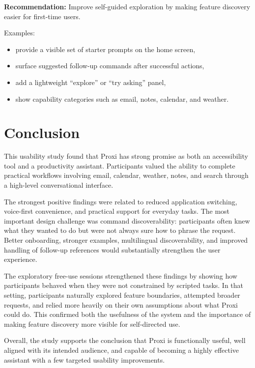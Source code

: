 \documentclass[12pt, titlepage]{article}
\begin{document}
\textbf{Recommendation:} Improve self-guided exploration by making
feature discovery easier for first-time users.

Examples:
\begin{itemize}
    \item provide a visible set of starter prompts on the home screen,
    \item surface suggested follow-up commands after successful actions,
    \item add a lightweight ``explore'' or ``try asking'' panel,
    \item show capability categories such as email, notes, calendar,
    and weather.
\end{itemize}

\section{Conclusion}

This usability study found that Proxi has strong promise as both an
accessibility tool and a productivity assistant. Participants valued the
ability to complete practical workflows involving email, calendar,
weather, notes, and search through a high-level conversational
interface.

The strongest positive findings were related to reduced application
switching, voice-first convenience, and practical support for everyday
tasks. The most important design challenge was command discoverability:
participants often knew what they wanted to do but were not always sure
how to phrase the request. Better onboarding, stronger examples,
multilingual discoverability, and improved handling of follow-up
references would substantially strengthen the user experience.

The exploratory free-use sessions strengthened these findings by showing
how participants behaved when they were not constrained by scripted
tasks. In that setting, participants naturally explored feature
boundaries, attempted broader requests, and relied more heavily on
their own assumptions about what Proxi could do. This confirmed both
the usefulness of the system and the importance of making feature
discovery more visible for self-directed use.

Overall, the study supports the conclusion that Proxi is functionally
useful, well aligned with its intended audience, and capable of becoming
a highly effective assistant with a few targeted usability improvements.

\appendix
\end{document}
